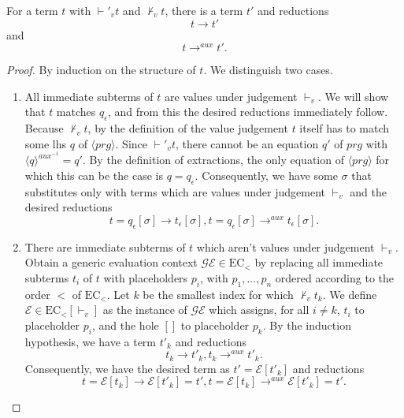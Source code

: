 \begin{lemma}

For a term $t$ with $\vdash'_v t$ and $\not\vdash_v t$, there is a term $t'$ and reductions
\[
t \longrightarrow t'
\]
and
\[
t \longrightarrow^{aux} t'.
\]

\begin{proof}

By induction on the structure of $t$. We distinguish two cases.
\begin{enumerate}
\item All immediate subterms of $t$ are values under judgement $\vdash_v$. We will show that $t$ matches $q_\epsilon$, and from this the desired reductions immediately follow. Because $\not\vdash_v t$, by the definition of the value judgement $t$ itself has to match some lhs $q$ of $\langle prg \rangle$. Since $\vdash'_v t$, there cannot be an equation $q'$ of $prg$ with $\langle q \rangle^{aux^{-1}} = q'$. By the definition of extractions, the only equation of $\langle prg \rangle$ for which this can be the case is $q = q_\epsilon$. Consequently, we have some $\sigma$ that substitutes only with terms which are values under judgement $\vdash_v$ and the desired reductions
\[
t = q_\epsilon[\sigma] \longrightarrow t_\epsilon[\sigma], t = q_\epsilon[\sigma] \longrightarrow^{aux} t_\epsilon[\sigma].
\]

\item There are immediate subterms of $t$ which aren't values under judgement $\vdash_v$. Obtain a generic evaluation context $\mathcal{GE} \in \textrm{EC}_<$ by replacing all immediate subterms $t_i$ of $t$ with placeholders $p_i$, with $p_1, ..., p_n$ ordered according to the order $<$ of $\textrm{EC}_<$. Let $k$ be the smallest index for which $\not\vdash_v t_k$. We define $\mathcal{E} \in \textrm{EC}_<[\vdash_v]$ as the instance of $\mathcal{GE}$ which assigns, for all $i \neq k$, $t_i$ to placeholder $p_i$, and the hole $[]$ to placeholder $p_k$. By the induction hypothesis, we have a term $t'_k$ and reductions
\[
t_k \longrightarrow t'_k, t_k \longrightarrow^{aux} t'_k.
\]
Consequently, we have the desired term as $t' = \mathcal{E}[t'_k]$ and reductions
\[
t = \mathcal{E}[t_k] \longrightarrow \mathcal{E}[t'_k] = t', t = \mathcal{E}[t_k] \longrightarrow^{aux} \mathcal{E}[t'_k] = t'.
\]
\end{enumerate}

\end{proof}

\end{lemma}

